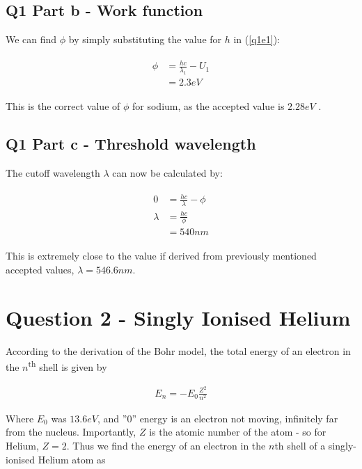 \documentclass[paper=a4, fontsize=12pt]{scrartcl}
\begin{document}
\subsection{Q1 Part b - Work function}

We can find $\phi$ by simply substituting the value for $h$ in (\ref{q1e1}):

\begin{align*}
\begin{split}
\phi &= \frac{hc}{\lambda_1} - U_1\\
&= 2.3 eV
\end{split}
\end{align*}

This is the correct value of $\phi$ for sodium, as the accepted value is $2.28 eV$ \cite{Workfunctions}.

\subsection{Q1 Part c - Threshold wavelength}

The cutoff wavelength $\lambda$ can now be calculated by:

\begin{align*}
\begin{split}
0 &= \frac{hc}{\lambda} - \phi\\
\lambda &= \frac{hc}{\phi}\\
&= 540 nm
\end{split}
\end{align*}

This is extremely close to the value if derived from previously mentioned accepted values, $\lambda = 546.6 nm$.

\clearpage

\section{Question 2 - Singly Ionised Helium}

According to the derivation of the Bohr model, the total energy of an electron in the $n$\textsuperscript{th} shell is given by

\begin{align*}
E_n = -E_0\frac{Z^2}{n^2}
\end{align*}

Where $E_0$ was $13.6 eV$, and ''$0$'' energy is an electron not moving, infinitely far from the nucleus. Importantly, $Z$ is the atomic number of the atom - so for Helium, $Z= 2$. Thus we find the energy of an electron in the $n$th shell of a singly-ionised Helium atom as
\end{document}
